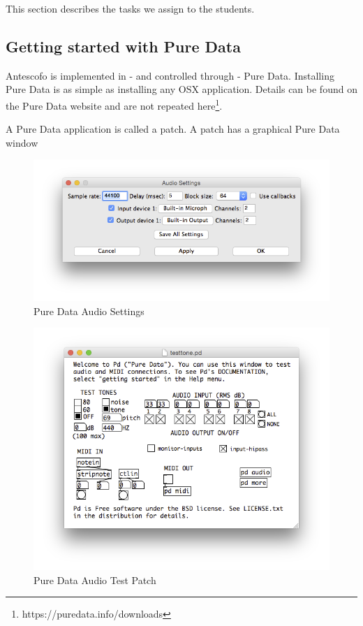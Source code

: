 \documentclass[onecolumn,nocopyrightspace,preprint]{sigplanconf}
\begin{document}
This section describes the tasks we assign to the students.

\subsection{Getting started with Pure Data}


Antescofo is implemented in - and controlled through - Pure Data.
Installing Pure Data is as simple as installing any OSX application. Details can be found
on the Pure Data website and are not repeated here\footnote{https://puredata.info/downloads}.

A Pure Data application is called a patch. A patch has a graphical Pure Data window



\begin{figure}[ht]
    \centering
    \includegraphics[scale=0.4]{fig/pd-audio.png}
    \caption{Pure Data Audio Settings}
    \label{fig:pd-audio}
\end{figure}


\begin{figure}[ht]
    \centering
    \includegraphics[scale=0.4]{fig/pd-test.png}
    \caption{Pure Data Audio Test Patch}
    \label{fig:pd-test}
\end{figure}
\end{document}

